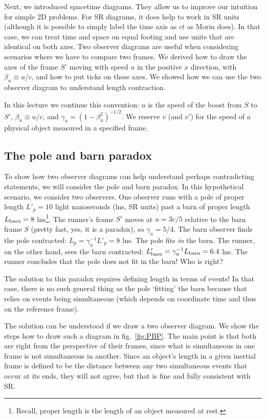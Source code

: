\documentclass[12pt]{article}
\begin{document}
Next, we introduced spacetime diagrams. They allow us to improve our intuition for simple 2D problems. For SR diagrams, it does help to work in SR units (although it is possible to simply label the time axis as $ct$ as Morin does). In that case, we can treat time and space on equal footing and use units that are identical on both axes. Two observer diagrams are useful when considering scenarios where we have to compare two frames. We derived how to draw the axes of the frame $S'$ moving with speed $u$ in the positive $x$ direction, with $\beta_u\equiv u/c$, and how to put ticks on these axes. We showed how we can use the two observer diagram to understand length contraction.

In this lecture we continue this convention: $u$ is the speed of the boost from $S$ to $S'$, $\beta_u\equiv u/c$, and $\gamma_u=(1-\beta_u^2)^{-1/2}$. We reserve $v$ (and $v'$) for the speed of a physical object measured in a specified frame.

\subsection{The pole and barn paradox}
To show how two observer diagrams can help understand perhaps contradicting statements, we will consider the pole and barn paradox. In this hypothetical scenario, we consider two observers. One observer runs with a pole of proper length $L'_p = 10$ light nanoseconds (lns, SR units) past a barn of proper length $L_{\rm barn} = 8$ lns\footnote{Recall, proper length is the length of an object measured at rest.}. The runner's frame $S'$ moves at $u=3c/5$ relative to the barn frame $S$ (pretty fast, yes, it is a paradox), so $\gamma_u=5/4$. The barn observer finds the pole contracted: $L_{p}=\gamma_u^{-1}L'_p=8$ lns. The pole fits {\it in} the barn. The runner, on the other hand, sees the barn contracted: $L'_{\rm barn}=\gamma_u^{-1}L_{\rm barn}=6.4$ lns. The runner concludes that the pole does not fit in the barn! Who is right?

The solution to this paradox requires defining length in terms of events! In that case, there is no such general thing as the pole `fitting’ the barn because that relies on events being simultaneous (which depends on coordinate time and thus on the reference frame).

The solution can be understood if we draw a two observer diagram. We show the steps how to draw such a diagram in fig.~\ref{fig:PBP}. The main point is that both are right from the perspective of their frames, since what is simultaneous in one frame is not simultaneous in another. Since an object's length in a given inertial frame is defined to be the distance between any two simultaneous events that occur at its ends, they will not agree, but that is fine and fully consistent with SR.
\end{document}
